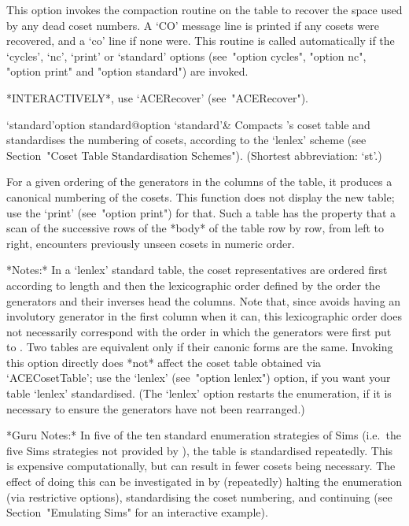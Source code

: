 This option invokes the compaction routine on the table to recover the
space used by any dead coset numbers. A `CO' message line  is  printed
if any cosets were recovered, and a  `co'  line  if  none  were.  This
routine is called automatically if  the  `cycles',  `nc',  `print'  or
`standard' options (see~"option cycles", "option nc",  "option  print"
and "option standard") are invoked.

*INTERACTIVELY*, use `ACERecover' (see~"ACERecover").

\>`standard'{option standard}@{option `standard'}&
Compacts {\ACE}'s  coset  table  and  standardises  the  numbering  of
cosets, according to the `lenlex'  scheme  (see  Section~"Coset  Table
Standardisation Schemes"). (Shortest abbreviation: `st'.)

For a given ordering of the generators in the columns of the table, it
produces a canonical numbering of the cosets. This function  does  not
display the new table; use the `print' (see~"option print") for  that.
Such a table has the property that a scan of the  successive  rows  of
the *body* of the table row by row, from  left  to  right,  encounters
previously unseen cosets in numeric order.

*Notes:*
In a `lenlex' standard table, the coset  representatives  are  ordered
first according to length and then the lexicographic order defined  by
the order the generators and their inverses  head  the  columns.  Note
that, since {\ACE} avoids having an involutory generator in the  first
column when it can, this  lexicographic  order  does  not  necessarily
correspond with the order in which the generators were  first  put  to
{\ACE}. Two tables are equivalent only if their canonic forms are  the
same. Invoking this option directly does *not* affect the {\GAP} coset
table obtained via  `ACECosetTable';  use  the  `lenlex'  (see~"option
lenlex") option, if you want your table  `lenlex'  standardised.  (The
`lenlex' option restarts the enumeration, if it is necessary to ensure
the generators have not been rearranged.)

*Guru Notes:*
In  five  of  the  ten  standard  enumeration   strategies   of   Sims
\cite{Sim94} (i.e.~the five Sims strategies not provided  by  {\ACE}),
the   table   is   standardised   repeatedly.   This   is    expensive
computationally, but can result in fewer cosets being  necessary.  The
effect of doing this can be investigated  in  {\ACE}  by  (repeatedly)
halting the enumeration (via restrictive options),  standardising  the
coset numbering, and continuing (see Section~"Emulating Sims"  for  an
interactive example).

